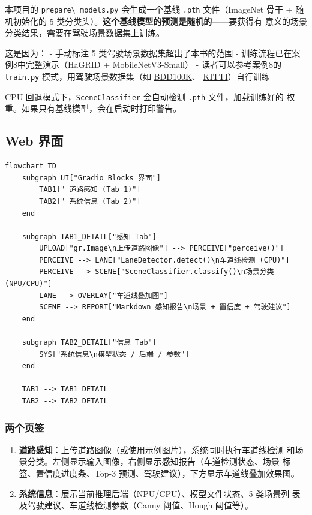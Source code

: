 本项目的 \passthrough{\lstinline!prepare\_models.py!} 会生成一个基线
\passthrough{\lstinline!.pth!} 文件（ImageNet 骨干 + 随机初始化的 5
类分类头）。\textbf{这个基线模型的预测是随机的}------要获得有
意义的场景分类结果，需要在驾驶场景数据集上训练。

这是因为： - 手动标注 5 类驾驶场景数据集超出了本书的范围 -
训练流程已在案例8中完整演示（HaGRID + MobileNetV3-Small） -
读者可以参考案例8的 \passthrough{\lstinline!train.py!}
模式，用驾驶场景数据集（如
\href{https://bdd-data.berkeley.edu/}{BDD100K}、
\href{http://www.cvlibs.net/datasets/kitti/}{KITTI}）自行训练

CPU 回退模式下，\passthrough{\lstinline!SceneClassifier!} 会自动检测
\passthrough{\lstinline!.pth!} 文件，加载训练好的
权重。如果只有基线模型，会在启动时打印警告。

\subsection{Web 界面}\label{src-experiment-case6-h19}

\begin{lstlisting}
flowchart TD
    subgraph UI["Gradio Blocks 界面"]
        TAB1[" 道路感知 (Tab 1)"]
        TAB2[" 系统信息 (Tab 2)"]
    end

    subgraph TAB1_DETAIL["感知 Tab"]
        UPLOAD["gr.Image\n上传道路图像"] --> PERCEIVE["perceive()"]
        PERCEIVE --> LANE["LaneDetector.detect()\n车道线检测 (CPU)"]
        PERCEIVE --> SCENE["SceneClassifier.classify()\n场景分类 (NPU/CPU)"]
        LANE --> OVERLAY["车道线叠加图"]
        SCENE --> REPORT["Markdown 感知报告\n场景 + 置信度 + 驾驶建议"]
    end

    subgraph TAB2_DETAIL["信息 Tab"]
        SYS["系统信息\n模型状态 / 后端 / 参数"]
    end

    TAB1 --> TAB1_DETAIL
    TAB2 --> TAB2_DETAIL
\end{lstlisting}

\subsubsection{两个页签}\label{src-experiment-case6-h20}

\begin{enumerate}
\def\labelenumi{\arabic{enumi}.}
\item
  \textbf{道路感知}：上传道路图像（或使用示例图片），系统同时执行车道线检测
  和场景分类。左侧显示输入图像，右侧显示感知报告（车道检测状态、场景
  标签、置信度进度条、Top-3 预测、驾驶建议），下方显示车道线叠加效果图。
\item
  \textbf{系统信息}：展示当前推理后端（NPU/CPU）、模型文件状态、5
  类场景列 表及驾驶建议、车道线检测参数（Canny 阈值、Hough 阈值等）。
\end{enumerate}

